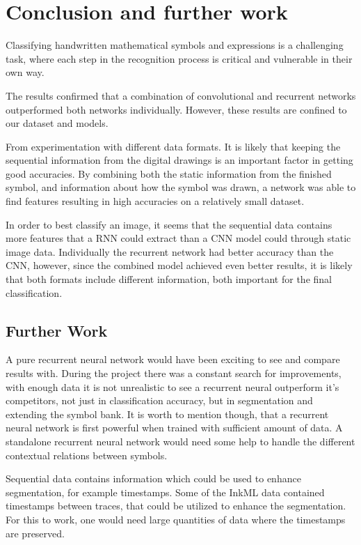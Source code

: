 \chapter{Conclusion and further work}
Classifying handwritten mathematical symbols and expressions is a challenging task, where each step in the recognition process is critical and vulnerable in their own way. 

The results confirmed that a combination of convolutional and recurrent networks outperformed both networks individually. However, these results are confined to our dataset and models.  

From experimentation with different data formats. It is likely that keeping the sequential information from the digital drawings is an important factor in getting good accuracies. By combining both the static information from the finished symbol, and information about how the symbol was drawn, a network was able to find features resulting in high accuracies on a relatively small dataset.

In order to best classify an image, it seems that the sequential data contains more features that a RNN could extract than a CNN model could through static image data. Individually the recurrent network had better accuracy than the CNN, however, since the combined model achieved even better results, it is likely that both formats include different information, both important for the final classification.

\section{Further Work}

A pure recurrent neural network would have been exciting to see and compare results with. During the project there was a constant search for improvements, with enough data it is not unrealistic to see a recurrent neural outperform it's competitors, not just in classification accuracy, but in segmentation and extending the symbol bank. It is worth to mention though, that a recurrent neural network is first powerful when trained with sufficient amount of data. A standalone recurrent neural network would need some help to handle the different contextual relations between symbols.

Sequential data contains information which could be used to enhance segmentation, for example timestamps. Some of the InkML data contained timestamps between traces, that could be utilized to enhance the segmentation. For this to work, one would need large quantities of data where the timestamps are preserved.

